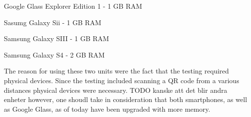 Google Glass Explorer Edition 1 -  1 GB RAM

Sasumg Galaxy Sii - 1 GB RAM

Samsung Galaxy SIII - 1 GB RAM

Samsung Galaxy S4 - 2 GB RAM

The reason for using these two units were the fact that the testing required physical devices. Since the testing included scanning a QR code from a various distances physical devices were necessary. TODO kanske att det blir andra enheter however, one shoudl take in consideration that both smartphones, as well as Google Glass, as of today have been upgraded with more memory.